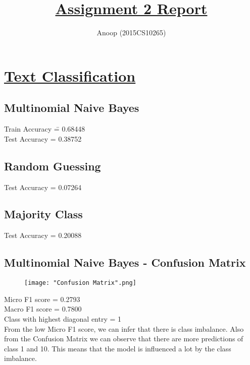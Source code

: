 \documentclass[12pt]{article}
\title{\textbf{\underline{Assignment 2 Report}}}
\author{Anoop (2015CS10265)}
\begin{document}
\maketitle

\section*{\underline{Text Classification}}
\subsection*{Multinomial Naive Bayes}
\begin{addmargin}[0.3in]{0in}
\begin{tabbing}
Train Accuracy \= = 0.68448\\
Test Accuracy \> = 0.38752
\end{tabbing}
\end{addmargin}
\subsection*{Random Guessing}
\begin{addmargin}[0.3in]{0in}
Test Accuracy = 0.07264
\end{addmargin}
\subsection*{Majority Class}
\begin{addmargin}[0.3in]{0in}
Test Accuracy = 0.20088
\end{addmargin}
\subsection*{Multinomial Naive Bayes - Confusion Matrix}
\begin{wrapfigure}[10]{l}{0.5\textwidth}
\texttt{[image: "Confusion Matrix".png]}
\end{wrapfigure}
\hspace{0.1mm}
\begin{addmargin}[0.3in]{0in}
Micro F1 score = 0.2793\\
Macro F1 score = 0.7800\\
Class with highest diagonal entry = 1\\
From the low Micro F1 score, we can infer that there is class imbalance. Also from the Confusion Matrix we can observe that there are more predictions of class 1 and 10. This means that the model is influenced a lot by the class imbalance.
\end{addmargin}
\newpage
\end{document}
